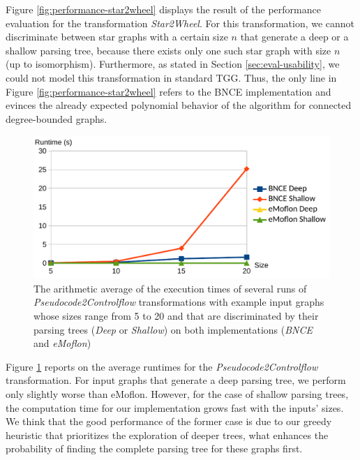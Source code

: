 Figure \ref{fig:performance-star2wheel} displays the result of the performance evaluation for the transformation \emph{Star2Wheel}. For this transformation, we cannot discriminate between star graphs with a certain size $n$ that generate a deep or a shallow parsing tree, because there exists only one such star graph with size $n$ (up to isomorphism). Furthermore, as stated in Section \ref{sec:eval-usability}, we could not model this transformation in standard TGG. Thus, the only line in Figure \ref{fig:performance-star2wheel} refers to the BNCE implementation and evinces the already expected polynomial behavior of the algorithm for connected degree-bounded graphs.

\begin{figure}
	\centering
	\includegraphics[width=.6\textwidth]{figures/performance/pseudocode2controlflow}
	\caption{The arithmetic average of the execution times of several runs of \emph{Pseudocode2Controlflow} transformations with example input graphs whose sizes range from 5 to 20 and that are discriminated by their parsing trees (\emph{Deep} or \emph{Shallow}) on both implementations (\emph{BNCE} and \emph{eMoflon})}
	\label{fig:performance-pseudocode2controlflow}
\end{figure}

Figure \ref{fig:performance-pseudocode2controlflow} reports on the average runtimes for the \emph{Pseudocode2Controlflow} transformation. For input graphs that generate a deep parsing tree, we perform only slightly worse than eMoflon. However, for the case of shallow parsing trees, the computation time for our implementation grows fast with the inputs' sizes. We think that the good performance of the former case is due to our greedy heuristic that prioritizes the exploration of deeper trees, what enhances the probability of finding the complete parsing tree for these graphs first.

